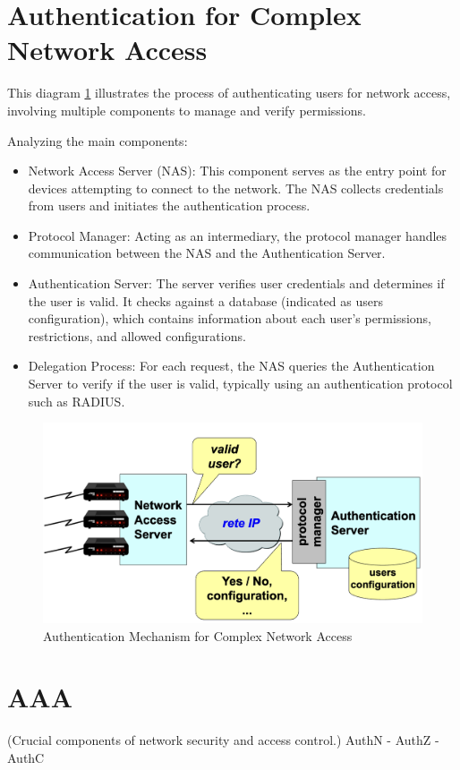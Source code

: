 \section{Authentication for Complex Network Access}
This diagram \ref{fig:network_authentication} illustrates the process of authenticating users for network access, involving multiple components to manage and verify permissions. 

Analyzing the main components:
\begin{itemize}
    \item Network Access Server (NAS): This component serves as the entry point for devices attempting to connect to the network. The NAS collects credentials from users and initiates the authentication process.
    \item Protocol Manager: Acting as an intermediary, the protocol manager handles communication between the NAS and the Authentication Server.
    \item Authentication Server: The server verifies user credentials and determines if the user is valid. It checks against a database (indicated as users configuration), which contains information about each user’s permissions, restrictions, and allowed configurations.
    \item Delegation Process: For each request, the NAS queries the Authentication Server to verify if the user is valid, typically using an authentication protocol such as RADIUS.
\end{itemize}
\begin{figure}[H]
    \includegraphics[width=\linewidth]{Images/NetSec/netsecConclusion.png}
    \caption{Authentication Mechanism for Complex Network Access}
    \label{fig:network_authentication}
\end{figure}

\section{AAA}
\begin{center}
    (Crucial components of network security and access control.) \newline
    AuthN - AuthZ - AuthC
\end{center}

